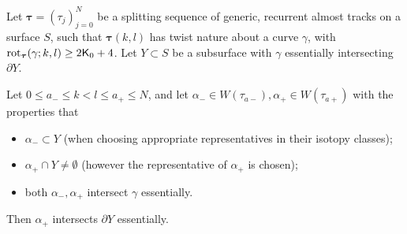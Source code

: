 \begin{lemma}\label{lem:subsurfacesdontrepeat}
Let $\bm\tau=(\tau_j)_{j=0}^N$ be a splitting sequence of generic, recurrent almost tracks on a surface $S$, such that $\bm\tau(k,l)$ has twist nature about a curve $\gamma$, with $\mathrm{rot}_{\bm\tau}(\gamma;k,l)\geq 2\mathsf{K}_0+4$. Let $Y\subset S$ be a subsurface with $\gamma$ essentially intersecting $\partial Y$.

Let $0\leq a_-\leq k<l\leq a_+\leq N$, and let $\alpha_-\in W(\tau_{a-}),\alpha_+\in W(\tau_{a+})$ with the properties that
\begin{itemize}
\item $\alpha_-\subset Y$ (when choosing appropriate representatives in their isotopy classes);
\item $\alpha_+\cap Y\not=\emptyset$ (however the representative of $\alpha_+$ is chosen);
\item both $\alpha_-,\alpha_+$ intersect $\gamma$ essentially.
\end{itemize}

Then $\alpha_+$ intersects $\partial Y$ essentially.
\end{lemma}
